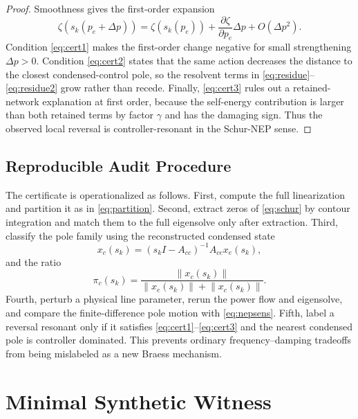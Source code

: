 \documentclass[conference]{IEEEtran}
\newcommand{\norm}[1]{\left\lVert #1 \right\rVert}
\begin{document}
\begin{proof}
Smoothness gives the first-order expansion
\[
  \zeta(s_k(p_e+\Delta p))=
  \zeta(s_k(p_e))+
  \frac{\partial\zeta}{\partial p_e}\Delta p+O(\Delta p^2).
\]
Condition \eqref{eq:cert1} makes the first-order change negative for small strengthening $\Delta p>0$. Condition \eqref{eq:cert2} states that the same action decreases the distance to the closest condensed-control pole, so the resolvent terms in \eqref{eq:residue}--\eqref{eq:residue2} grow rather than recede. Finally, \eqref{eq:cert3} rules out a retained-network explanation at first order, because the self-energy contribution is larger than both retained terms by factor $\gamma$ and has the damaging sign. Thus the observed local reversal is controller-resonant in the Schur-NEP sense.
\end{proof}

\subsection{Reproducible Audit Procedure}

The certificate is operationalized as follows. First, compute the full linearization and partition it as in \eqref{eq:partition}. Second, extract zeros of \eqref{eq:schur} by contour integration and match them to the full eigensolve only after extraction. Third, classify the pole family using the reconstructed condensed state
\[
  x_c(s_k)=(s_kI-A_{cc})^{-1}A_{ce}x_e(s_k),
\]
and the ratio
\[
  \pi_c(s_k)=
  \frac{\norm{x_c(s_k)}}{\norm{x_e(s_k)}+\norm{x_c(s_k)}} .
\]
Fourth, perturb a physical line parameter, rerun the power flow and eigensolve, and compare the finite-difference pole motion with \eqref{eq:nepsens}. Fifth, label a reversal resonant only if it satisfies \eqref{eq:cert1}--\eqref{eq:cert3} and the nearest condensed pole is controller dominated. This prevents ordinary frequency--damping tradeoffs from being mislabeled as a new Braess mechanism.

\section{Minimal Synthetic Witness}
\end{document}
